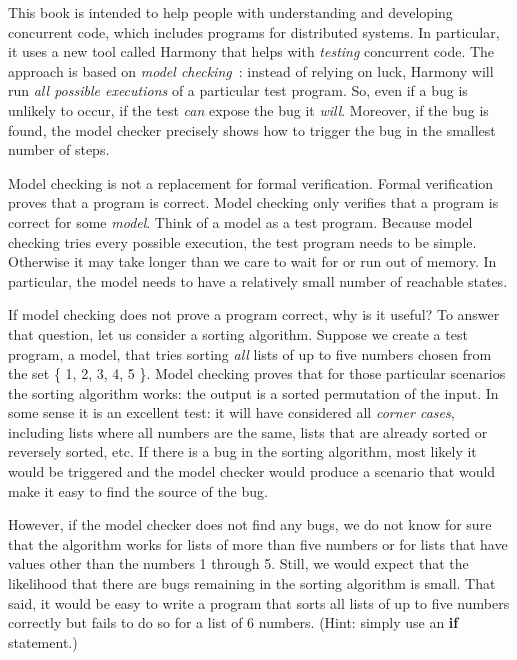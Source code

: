 \documentclass{report}
\begin{document}
This book is intended to help people with understanding and
developing concurrent code, which includes programs for distributed
systems.  In particular, it uses a new tool
called Harmony that helps with \emph{testing} concurrent code.
The approach is based on \emph{model checking}~\cite{CES86}:
%
instead of relying
on luck, Harmony will run \emph{all possible executions} of a particular
test program.  So, even if a bug is unlikely to occur, if the test
\emph{can} expose the bug it \emph{will}.  Moreover, if the bug is
found, the model checker precisely shows how to trigger the bug in
the smallest number of steps.

Model checking is not a replacement for formal verification.
%
Formal verification proves that a program is correct.  Model checking only
verifies that a program is correct for some \emph{model}.  Think of
a model as a test program.
Because model checking tries every possible execution, the test
program needs to be simple. Otherwise it may take longer than we
care to wait for or run out of memory.
In particular, the model needs to have a relatively small number of
reachable states.

If model checking does not prove a program correct, why is it
useful?
To answer that question, let us consider a sorting algorithm.
Suppose we create a test program, a model, that tries sorting
\emph{all} lists of up to five numbers chosen from the set
\{ 1, 2, 3, 4, 5 \}.  Model checking proves that for those particular
scenarios the sorting algorithm works: the output is a sorted
permutation of the input.  In some sense it is an excellent test:
it will have considered all \emph{corner cases},
%
including lists where all
numbers are the same, lists that are already sorted or reversely
sorted, etc.  If there is a bug in the sorting algorithm, most
likely it would be triggered and the model checker would produce a
scenario that would make it easy to find the source of the bug.

However, if the model checker does not find any bugs, we do not
know for sure that the algorithm works for lists of more than
five numbers or for lists that have values other than the numbers
1 through 5.  Still, we would expect that the likelihood that there
are bugs remaining in the sorting algorithm is small.
That said, it would be easy to write a program
that sorts all lists of up to five numbers correctly but fails to
do so for a list of 6 numbers.  (Hint: simply use an \textbf{if}
statement.)
\end{document}
